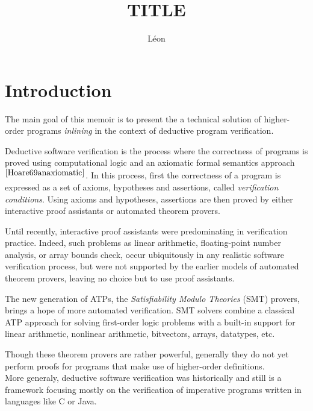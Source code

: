 \documentclass[a4paper,11pt,oneside]{article}
\title{TITLE}
\author{Léon}
\theoremstyle{plain}
\begin{document}
\maketitle

\tableofcontents


\section{Introduction}

	The main goal of this memoir is to present the a technical solution of higher-order programs \textit{inlining} in the context of deductive program verification. 
	
	Deductive software verification is the process where the correctness
of programs is proved using computational logic and an axiomatic formal semantics approach$^{\cite{Hoare69anaxiomatic}}$.
	In this process, first the correctness of a program is expressed
as a set of axioms, hypotheses and assertions, called \textit{verification conditions}.
	Using axioms and hypotheses, assertions are then proved
by either interactive proof assistants or automated theorem provers.

	Until recently, interactive proof assistants were predominating
in verification practice.
	Indeed, such problems as linear arithmetic, floating-point number analysis,
or array bounds check, occur ubiquitously in any realistic software
 verification process, but were not supported by the earlier models of automated theorem provers, leaving no choice but to use proof assistants.
	
	The new generation of ATPs, the \textit{Satisfiability Modulo Theories} (SMT) provers, brings a hope of more automated verification.
	SMT solvers combine a classical ATP approach for solving first-order logic problems with a built-in support for linear arithmetic, nonlinear arithmetic, bitvectors, arrays, datatypes, etc.
	
	Though these theorem provers are rather powerful, generally they do not yet perform proofs for programs that make use of higher-order definitions. \\
	 
	More generaly, deductive software verification was historically and still is a framework focusing mostly on the verification of imperative programs written in languages like C or Java.
	
\end{document}

